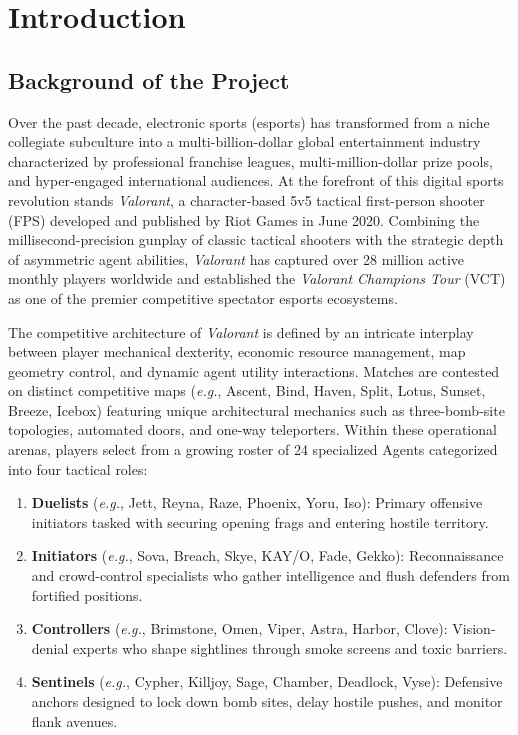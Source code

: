 \chapter{Introduction}
\label{chap:introduction}

\section{Background of the Project}
\label{sec:background}

Over the past decade, electronic sports (esports) has transformed from a niche collegiate subculture into a multi-billion-dollar global entertainment industry characterized by professional franchise leagues, multi-million-dollar prize pools, and hyper-engaged international audiences. At the forefront of this digital sports revolution stands \textit{Valorant}, a character-based 5v5 tactical first-person shooter (FPS) developed and published by Riot Games in June 2020. Combining the millisecond-precision gunplay of classic tactical shooters with the strategic depth of asymmetric agent abilities, \textit{Valorant} has captured over 28 million active monthly players worldwide and established the \textit{Valorant Champions Tour} (VCT) as one of the premier competitive spectator esports ecosystems.

The competitive architecture of \textit{Valorant} is defined by an intricate interplay between player mechanical dexterity, economic resource management, map geometry control, and dynamic agent utility interactions. Matches are contested on distinct competitive maps (\textit{e.g.}, Ascent, Bind, Haven, Split, Lotus, Sunset, Breeze, Icebox) featuring unique architectural mechanics such as three-bomb-site topologies, automated doors, and one-way teleporters. Within these operational arenas, players select from a growing roster of 24 specialized Agents categorized into four tactical roles:
\begin{enumerate}
    \item \textbf{Duelists} (\textit{e.g.}, Jett, Reyna, Raze, Phoenix, Yoru, Iso): Primary offensive initiators tasked with securing opening frags and entering hostile territory.
    \item \textbf{Initiators} (\textit{e.g.}, Sova, Breach, Skye, KAY/O, Fade, Gekko): Reconnaissance and crowd-control specialists who gather intelligence and flush defenders from fortified positions.
    \item \textbf{Controllers} (\textit{e.g.}, Brimstone, Omen, Viper, Astra, Harbor, Clove): Vision-denial experts who shape sightlines through smoke screens and toxic barriers.
    \item \textbf{Sentinels} (\textit{e.g.}, Cypher, Killjoy, Sage, Chamber, Deadlock, Vyse): Defensive anchors designed to lock down bomb sites, delay hostile pushes, and monitor flank avenues.
\end{enumerate}

